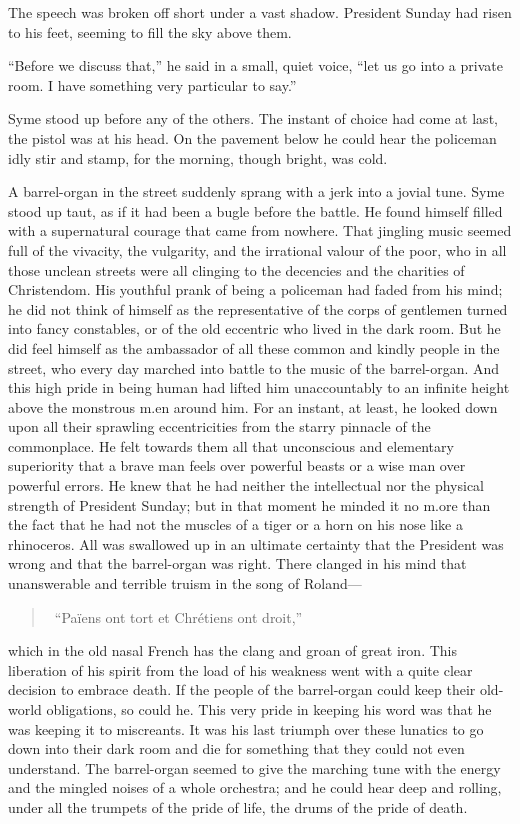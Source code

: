 \documentclass{book}
\begin{document}
The speech was broken off short under a vast shadow. President Sunday had risen to his feet, seeming to fill the sky above them.

“Before we discuss that,” he said in a small, quiet voice, “let us go into a private room. I have something very particular to say.”

Syme stood up before any of the others. The instant of choice had come at last, the pistol was at his head. On the pavement below he could hear the policeman idly stir and stamp, for the morning, though bright, was cold.

A barrel-organ in the street suddenly sprang with a jerk into a jovial tune. Syme stood up taut, as if it had been a bugle before the battle. He found himself filled with a supernatural courage that came from nowhere. That jingling music seemed full of the vivacity, the vulgarity, and the irrational valour of the poor, who in all those unclean streets were all clinging to the decencies and the charities of Christendom. His youthful prank of being a policeman had faded from his mind; he did not think of himself as the representative of the corps of gentlemen turned into fancy constables, or of the old eccentric who lived in the dark room. But he did feel himself as the ambassador of all these common and kindly people in the street, who every day marched into battle to the music of the barrel-organ. And this high pride in being human had lifted him unaccountably to an infinite height above the monstrous m.en around him. For an instant, at least, he looked down upon all their sprawling eccentricities from the starry pinnacle of the commonplace. He felt towards them all that unconscious and elementary superiority that a brave man feels over powerful beasts or a wise man over powerful errors. He knew that he had neither the intellectual nor the physical strength of President Sunday; but in that moment he minded it no m.ore than the fact that he had not the muscles of a tiger or a horn on his nose like a rhinoceros. All was swallowed up in an ultimate certainty that the President was wrong and that the barrel-organ was right. There clanged in his mind that unanswerable and terrible truism in the song of Roland—

\begin{quotation}\
	“Païens ont tort et Chrétiens ont droit,”
\end{quotation}

which in the old nasal French has the clang and groan of great iron. This liberation of his spirit from the load of his weakness went with a quite clear decision to embrace death. If the people of the barrel-organ could keep their old-world obligations, so could he. This very pride in keeping his word was that he was keeping it to miscreants. It was his last triumph over these lunatics to go down into their dark room and die for something that they could not even understand. The barrel-organ seemed to give the marching tune with the energy and the mingled noises of a whole orchestra; and he could hear deep and rolling, under all the trumpets of the pride of life, the drums of the pride of death.
\end{document}
